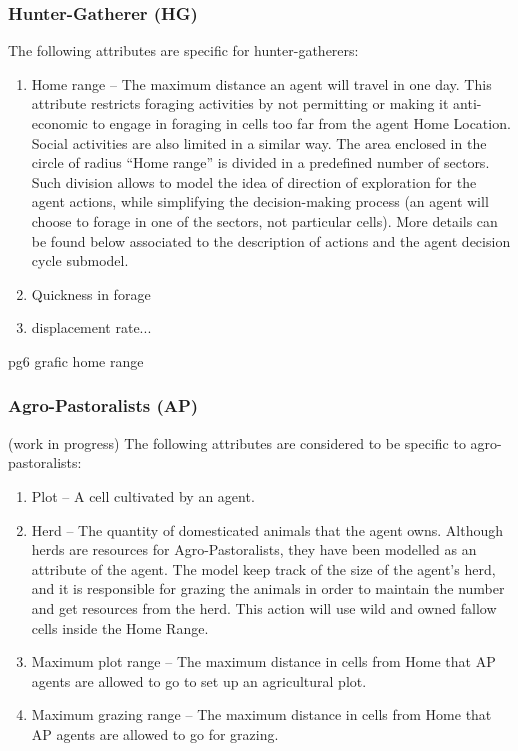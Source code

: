 \subsubsection{Hunter-Gatherer (HG)}
The following attributes are specific for hunter-gatherers:
\begin{enumerate}
\item Home range – The maximum distance an agent will travel in one day. This attribute restricts
foraging activities by not permitting or making it anti-economic to engage in foraging in cells
too far from the agent Home Location. Social activities are also limited in a similar way.
The area enclosed in the circle of radius “Home range” is divided in a predefined number of
sectors. Such division allows to model the idea of direction of exploration for the agent
actions, while simplifying the decision-making process (an agent will choose to forage in one
of the sectors, not particular cells). More details can be found below associated to the
description of actions and the agent decision cycle submodel.

\item Quickness in forage
\item displacement rate...

\end{enumerate}


pg6 grafic home range


\subsubsection{Agro-Pastoralists (AP)} (work in progress)
The following attributes are considered to be specific to agro-pastoralists:

\begin{enumerate}
\item Plot – A cell cultivated by an agent.
\item Herd – The quantity of domesticated animals that the agent owns. Although herds are
resources for Agro-Pastoralists, they have been modelled as an attribute of the agent. The
model keep track of the size of the agent's herd, and it is responsible for grazing the animals
in order to maintain the number and get resources from the herd. This action will use wild and
owned fallow cells inside the Home Range.
\item Maximum plot range – The maximum distance in cells from Home that AP agents are
allowed to go to set up an agricultural plot.
\item Maximum grazing range – The maximum distance in cells from Home that AP agents are
allowed to go for grazing.
\end{enumerate}


